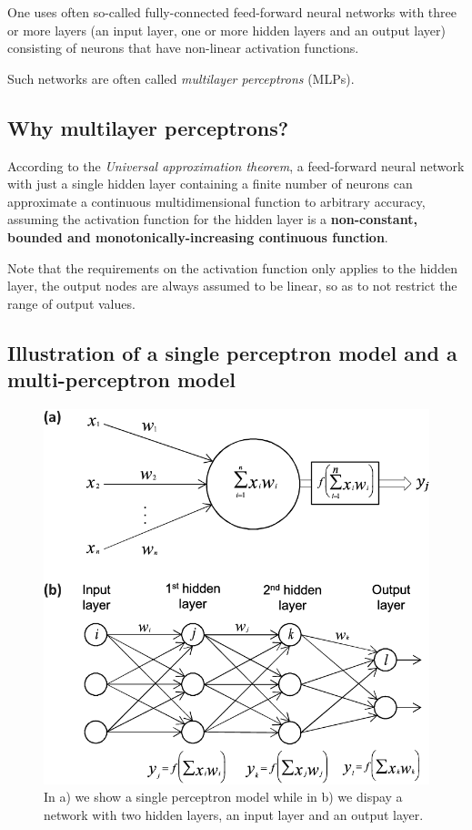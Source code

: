 \documentclass[%
oneside,                 %
final,                   %
10pt]{article}
\begin{document}
One uses often so-called fully-connected feed-forward neural networks
with three or more layers (an input layer, one or more hidden layers
and an output layer) consisting of neurons that have non-linear
activation functions.

Such networks are often called \emph{multilayer perceptrons} (MLPs).

\subsection{Why multilayer perceptrons?}

According to the \emph{Universal approximation theorem}, a feed-forward
neural network with just a single hidden layer containing a finite
number of neurons can approximate a continuous multidimensional
function to arbitrary accuracy, assuming the activation function for
the hidden layer is a \textbf{non-constant, bounded and
monotonically-increasing continuous function}.

Note that the requirements on the activation function only applies to
the hidden layer, the output nodes are always assumed to be linear, so
as to not restrict the range of output values.

\subsection{Illustration of a single perceptron model and a multi-perceptron model}

\begin{figure}[!ht]  %
  \centerline{\includegraphics[width=0.8\linewidth]{figures/nns.png}}
  \caption{
  In a) we show a single perceptron model while in b) we dispay a network with two  hidden layers, an input layer and an output layer.
  }
\end{figure}
\end{document}
